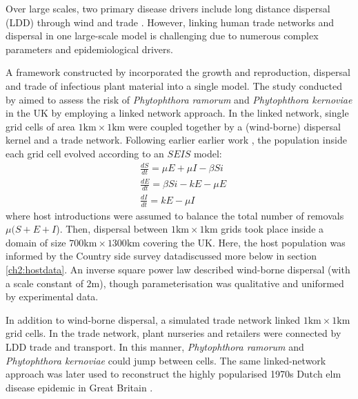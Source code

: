 Over large scales, two primary disease drivers include long distance dispersal (LDD) through wind \cite{golan2017long, gross2014h} and
trade \cite{ash-dieback-costs, perrings2016options, harwood2009epidemiological, doi:10.1098/rsif.2005.0051}.
However, linking human trade networks and dispersal in one large-scale model is challenging due to numerous complex parameters 
and epidemiological drivers. 

A framework constructed by \cite{harwood2009epidemiological} incorporated the growth and reproduction, dispersal and trade
of infectious plant material into a single model. The study conducted by \cite{harwood2009epidemiological} aimed
to assess the risk of \textit{Phytophthora ramorum} and \textit{Phytophthora kernoviae} in the UK by
employing a linked network approach. 
In the linked network, single grid cells of area $\mathrm{1km \times 1km}$ were coupled together by a (wind-borne)
dispersal kernel and a trade network. 
Following earlier earlier work \cite{madden2007study}, the population inside each grid cell evolved according
to an $SEIS$ model:
\begin{align}
    \label{eq:phyt-model1}
    &\frac{dS}{dt} = \mu E + \mu I - \beta S i\\
    &\frac{dE}{dt} =  \beta S i - k E - \mu E   \\
    \label{eq:phyt-model3}
    &\frac{dI}{dt} = k E - \mu I
\end{align}
where host introductions were assumed to balance the total number of removals $\mu (S + E + I$).
Then, dispersal between $\mathrm{1km \times 1km}$ grids took place inside a domain of size $\mathrm{700km \times 1300km}$ 
covering the UK. Here, the host population was informed by the Country side survey data\textemdash discussed more 
below in section \ref{ch2:hostdata}. An inverse square power law described wind-borne dispersal (with a scale constant
of $2\mathrm{m}$), though parameterisation was qualitative and uniformed by experimental data.

In addition to wind-borne dispersal, a simulated trade network linked $\mathrm{1km \times 1km}$ grid cells. 
In the trade network, plant nurseries and retailers were connected by LDD trade and transport. 
In this manner, \textit{Phytophthora ramorum} and \textit{Phytophthora kernoviae} could jump 
between cells. The same linked-network approach was later used to reconstruct the highly 
popularised 1970s Dutch elm disease epidemic in Great Britain \cite{doi:10.1111/j.1365-3059.2010.02391.x, potter2011learning}.

